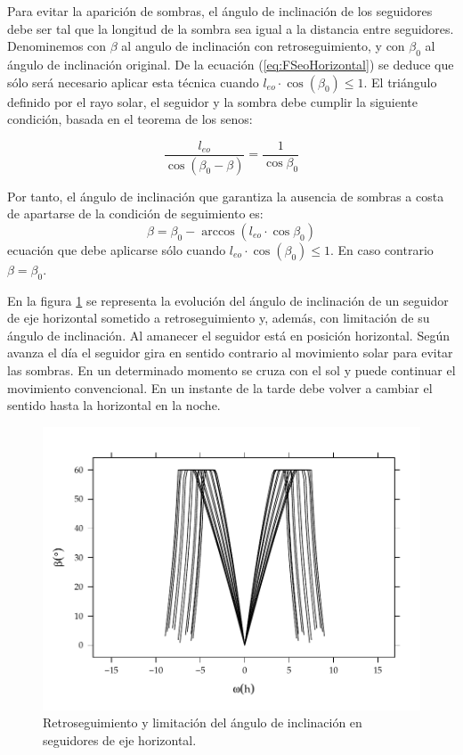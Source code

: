 Para evitar la
aparición de sombras, el ángulo de inclinación de los seguidores debe
ser tal que la longitud de la sombra sea igual a la distancia entre
seguidores. Denominemos con $\beta$ al angulo de inclinación con
retroseguimiento, y con $\beta_0$ al ángulo de inclinación
original. De la ecuación (\ref{eq:FSeoHorizontal}) se deduce que
sólo será necesario aplicar esta técnica cuando $l_{eo} \cdot \cos(\beta_0) \leq 1$. El
triángulo definido por el rayo solar, el seguidor y la sombra debe
cumplir la siguiente condición, basada en el teorema de los senos:

\begin{equation}
  \label{eq:BT_senos}
  \frac{l_{eo}}{\cos(\beta_0-\beta)}=\frac{1}{\cos{\beta_0}}
\end{equation}

Por tanto, el ángulo de inclinación que garantiza la ausencia de
sombras a costa de apartarse de la condición de seguimiento es:
\begin{equation}
  \label{eq:retroseguimiento}
  \beta=\beta_0-\arccos(l_{eo}\cdot\cos{\beta_0})  
\end{equation}
ecuación que debe aplicarse sólo cuando $l_{eo} \cdot
\cos(\beta_0) \leq 1$. En caso contrario $\beta = \beta_0$.

En la figura \ref{fig:Backtracking} se representa la evolución del
ángulo de inclinación de un seguidor de eje horizontal sometido a
retroseguimiento y, además, con limitación de su ángulo de
inclinación.  Al amanecer el seguidor está en posición
horizontal. Según avanza el día el seguidor gira en sentido
contrario al movimiento solar para evitar las sombras. En un
determinado momento se cruza con el sol y puede continuar el
movimiento convencional. En un instante de la tarde debe volver a
cambiar el sentido hasta la horizontal en la noche.  

\begin{figure}
  \centering
  \includegraphics[scale=0.7]{../figs/BackTracking}
  \caption{Retroseguimiento y limitación del ángulo de inclinación
    en seguidores de eje horizontal.}
  \label{fig:Backtracking}
\end{figure}


